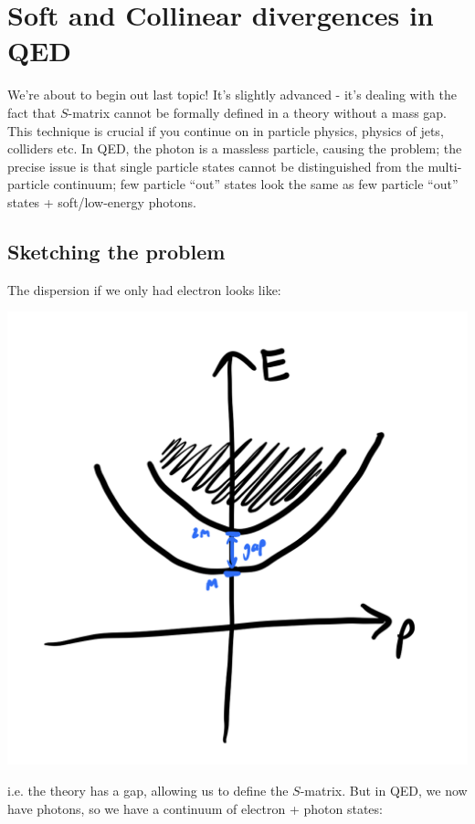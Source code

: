 \section{Soft and Collinear divergences in QED}

We're about to begin out last topic! It's slightly advanced - it's dealing with the fact that $S$-matrix cannot be formally defined in a theory without a mass gap. This technique is crucial if you continue on in particle physics, physics of jets, colliders etc. In QED, the photon is a massless particle, causing the problem; the precise issue is that single particle states cannot be distinguished from the multi-particle continuum; few particle ``out'' states look the same as few particle ``out'' states + soft/low-energy photons.

\subsection{Sketching the problem}

The dispersion if we only had electron looks like:

\begin{center}
    \includegraphics[scale=0.35]{Lectures/Images/lec14-massgap.png}
\end{center}

i.e. the theory has a gap, allowing us to define the $S$-matrix. But in QED, we now have photons, so we have a continuum of electron + photon states:

